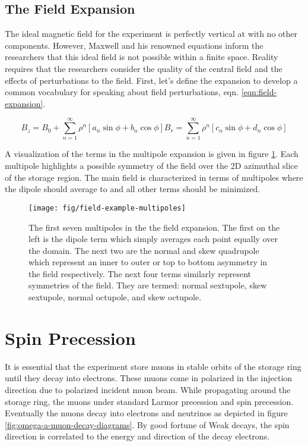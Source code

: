 \subsection{The Field Expansion}

The ideal magnetic field for the experiment is perfectly vertical at \bmagic with no other components.  However, Maxwell and his renowned equations inform the researchers that this ideal field is not possible within a finite space.  Reality requires that the researchers consider the quality of the central field and the effects of perturbations to the field.  First, let's define the expansion to develop a common vocabulary for speaking about field perturbations, eqn. \ref{eqn:field-expansion}.

\begin{equation}
B_z = B_0 + \sum_{n=1}^{\infty} \rho^n[a_n \sin{\phi} + b_n \cos{\phi}]
B_r = \sum_{n=1}^{\infty} \rho^n[c_n \sin{\phi} + d_n \cos{\phi}]
\label{eqn:field-expansion}
\end{equation}

\noindent
A visualization of the terms in the multipole expansion is given in figure \ref{fig:field-example-multipoles}.  Each multipole highlights a possible symmetry of the field over the 2D azimuthal slice of the storage region. The main field is characterized in terms of multipoles where the dipole should average to \bmagic and all other terms should be minimized.

\begin{figure}
\label{fig:field-example-multipoles}
\texttt{[image: fig/field-example-multipoles]}
\caption{The first seven multipoles in the the field expansion.  The first on the left is the dipole term which simply averages each point equally over the domain.  The next two are the normal and skew quadrupole which represent an inner to outer or top to bottom asymmetry in the field respectively.  The next four terms similarly represent symmetries of the field.  They are termed: normal sextupole, skew sextupole, normal octupole, and skew octupole.}
\end{figure}

\section{Spin Precession}

It is essential that the experiment store muons in stable orbits of the storage ring until they decay into electrons.  These muons come in polarized in the injection direction due to polarized incident muon beam.  While propagating around the storage ring, the muons under standard Larmor precession and spin precession.  Eventually the muons decay into electrons and neutrinos as depicted in figure \ref{fig:omega-a-muon-decay-diagrams}.  By good fortune of Weak decays, the spin direction is correlated to the energy and direction of the decay electrons.

